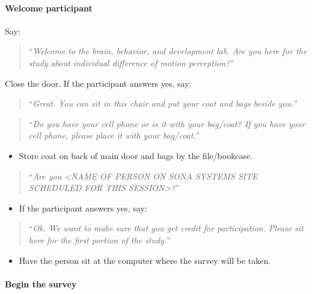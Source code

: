 \documentclass[]{article}
\providecommand{\tightlist}{%
  \setlength{\itemsep}{0pt}\setlength{\parskip}{0pt}}
\let\oldparagraph\paragraph
\renewcommand{\paragraph}[1]{\oldparagraph{#1}\mbox{}}
\begin{document}
\hypertarget{welcome-participant}{%
\paragraph{Welcome participant}\label{welcome-participant}}

Say:

\begin{quote}
``\emph{Welcome to the brain, behavior, and development lab. Are you
here for the study about individual difference of motion perception?}''
\end{quote}

Close the door. If the participant answers yes, say:

\begin{quote}
``\emph{Great. You can sit in this chair and put your coat and bags
beside you.}''
\end{quote}

\begin{quote}
``\emph{Do you have your cell phone or is it with your bag/coat? If you
have your cell phone, please place it with your bag/coat.}''
\end{quote}

\begin{itemize}
\tightlist
\item
  Store coat on back of main door and bags by the file/bookcase.
\end{itemize}

\begin{quote}
``\emph{Are you \textless{}NAME OF PERSON ON SONA SYSTEMS SITE SCHEDULED
FOR THIS SESSION\textgreater{}?}''
\end{quote}

\begin{itemize}
\tightlist
\item
  If the participant answers yes, say:
\end{itemize}

\begin{quote}
``\emph{Ok. We want to make sure that you get credit for participation.
Please sit here for the first portion of the study.}''
\end{quote}

\begin{itemize}
\tightlist
\item
  Have the person sit at the computer where the survey will be taken.
\end{itemize}

\hypertarget{begin-the-survey}{%
\paragraph{Begin the survey}\label{begin-the-survey}}
\end{document}
